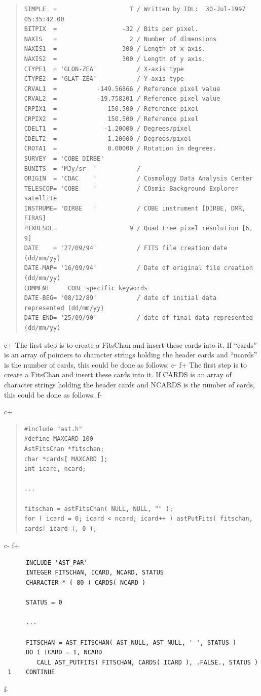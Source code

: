 \documentclass[twoside,11pt]{article}
\begin{document}
\begin{quote}
\small
\begin{verbatim}
SIMPLE  =                    T / Written by IDL:  30-Jul-1997 05:35:42.00
BITPIX  =                  -32 / Bits per pixel.
NAXIS   =                    2 / Number of dimensions
NAXIS1  =                  300 / Length of x axis.
NAXIS2  =                  300 / Length of y axis.
CTYPE1  = 'GLON-ZEA'           / X-axis type
CTYPE2  = 'GLAT-ZEA'           / Y-axis type
CRVAL1  =           -149.56866 / Reference pixel value
CRVAL2  =           -19.758201 / Reference pixel value
CRPIX1  =              150.500 / Reference pixel
CRPIX2  =              150.500 / Reference pixel
CDELT1  =             -1.20000 / Degrees/pixel
CDELT2  =              1.20000 / Degrees/pixel
CROTA1  =              0.00000 / Rotation in degrees.
SURVEY  = 'COBE DIRBE'
BUNITS  = 'MJy/sr  '           /
ORIGIN  = 'CDAC    '           / Cosmology Data Analysis Center
TELESCOP= 'COBE    '           / COsmic Background Explorer satellite
INSTRUME= 'DIRBE   '           / COBE instrument [DIRBE, DMR, FIRAS]
PIXRESOL=                    9 / Quad tree pixel resolution [6, 9]
DATE    = '27/09/94'           / FITS file creation date (dd/mm/yy)
DATE-MAP= '16/09/94'           / Date of original file creation (dd/mm/yy)
COMMENT     COBE specific keywords
DATE-BEG= '08/12/89'           / date of initial data represented (dd/mm/yy)
DATE-END= '25/09/90'           / date of final data represented   (dd/mm/yy)
\end{verbatim}
\normalsize
\end{quote}

c+
The first step is to create a FitsChan and insert these cards into
it. If ``cards'' is an array of pointers to character strings holding
the header cards and ``ncards'' is the number of cards, this could be
done as follows:
c-
f+
The first step is to create a FitsChan and insert these cards into
it. If CARDS is an array of character strings holding the header cards
and NCARDS is the number of cards, this could be done as follows:
f-

c+
\begin{quote}
\small
\begin{verbatim}
#include "ast.h"
#define MAXCARD 100
AstFitsChan *fitschan;
char *cards[ MAXCARD ];
int icard, ncard;

...

fitschan = astFitsChan( NULL, NULL, "" );
for ( icard = 0; icard < ncard; icard++ ) astPutFits( fitschan, cards[ icard ], 0 );
\end{verbatim}
\normalsize
\end{quote}
c-
f+
\small
\begin{verbatim}
      INCLUDE 'AST_PAR'
      INTEGER FITSCHAN, ICARD, NCARD, STATUS
      CHARACTER * ( 80 ) CARDS( NCARD )

      STATUS = 0

      ...

      FITSCHAN = AST_FITSCHAN( AST_NULL, AST_NULL, ' ', STATUS )
      DO 1 ICARD = 1, NCARD
         CALL AST_PUTFITS( FITSCHAN, CARDS( ICARD ), .FALSE., STATUS )
 1    CONTINUE
\end{verbatim}
\normalsize
f-
\end{document}
